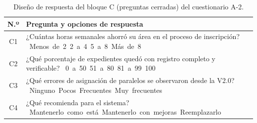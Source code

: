 \begin{table}[H]
    \centering
    \caption{Diseño de respuesta del bloque C (preguntas cerradas) del cuestionario A-2.}
    \label{tab:a2_cerradas}
    \renewcommand{\arraystretch}{1.60}
    \begin{tabularx}{\textwidth}{c L}
        \toprule
        \textbf{N.º} & \textbf{Pregunta y opciones de respuesta} \\
        \midrule
        C1 & ¿Cuántas horas semanales ahorró su área en el proceso de inscripción?\newline
            \mbox{\casilla{} Menos de 2}\quad \mbox{\casilla{} 2 a 4}\quad \mbox{\casilla{} 5 a 8}\quad \mbox{\casilla{} Más de 8} \\
        \addlinespace
        C2 & ¿Qué porcentaje de expedientes quedó con registro completo y verificable?\newline
            \mbox{\casilla{} 0 a 50}\quad \mbox{\casilla{} 51 a 80}\quad \mbox{\casilla{} 81 a 99}\quad \mbox{\casilla{} 100} \\
        \addlinespace
        C3 & ¿Qué errores de asignación de paralelos se observaron desde la V2.0?\newline
            \mbox{\casilla{} Ninguno}\quad \mbox{\casilla{} Pocos}\quad \mbox{\casilla{} Frecuentes}\quad \mbox{\casilla{} Muy frecuentes} \\
        \addlinespace
        C4 & ¿Qué recomienda para el sistema?\newline
            \mbox{\casilla{} Mantenerlo como está}\quad \mbox{\casilla{} Mantenerlo con mejoras}\quad \mbox{\casilla{} Reemplazarlo} \\
        \bottomrule
    \end{tabularx}
\end{table}

